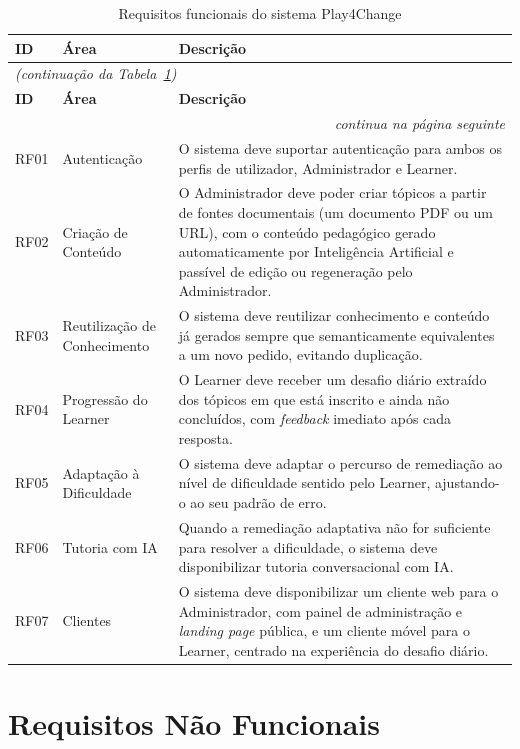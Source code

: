 \begin{longtable}{p{1.3cm}p{3.5cm}p{8cm}}
\caption{Requisitos funcionais do sistema Play4Change} \label{tab:rf} \\
\hline
\textbf{ID} & \textbf{Área} & \textbf{Descrição} \\
\hline
\endfirsthead
\multicolumn{3}{l}{\small \textit{(continuação da Tabela~\ref{tab:rf})}} \\
\hline
\textbf{ID} & \textbf{Área} & \textbf{Descrição} \\
\hline
\endhead
\hline \multicolumn{3}{r}{\small \textit{continua na página seguinte}} \\
\endfoot
\hline
\endlastfoot
RF01 & Autenticação      & O sistema deve suportar autenticação para ambos os perfis de utilizador, Administrador e Learner. \\
RF02 & Criação de Conteúdo & O Administrador deve poder criar tópicos a partir de fontes documentais (um documento PDF ou um URL), com o conteúdo pedagógico gerado automaticamente por Inteligência Artificial e passível de edição ou regeneração pelo Administrador. \\
RF03 & Reutilização de Conhecimento & O sistema deve reutilizar conhecimento e conteúdo já gerados sempre que semanticamente equivalentes a um novo pedido, evitando duplicação. \\
RF04 & Progressão do Learner & O Learner deve receber um desafio diário extraído dos tópicos em que está inscrito e ainda não concluídos, com \textit{feedback} imediato após cada resposta. \\
RF05 & Adaptação à Dificuldade & O sistema deve adaptar o percurso de remediação ao nível de dificuldade sentido pelo Learner, ajustando-o ao seu padrão de erro. \\
RF06 & Tutoria com IA    & Quando a remediação adaptativa não for suficiente para resolver a dificuldade, o sistema deve disponibilizar tutoria conversacional com IA. \\
RF07 & Clientes          & O sistema deve disponibilizar um cliente web para o Administrador, com painel de administração e \textit{landing page} pública, e um cliente móvel para o Learner, centrado na experiência do desafio diário. \\
\end{longtable}

\section{Requisitos Não Funcionais} \label{sec:rnf}

